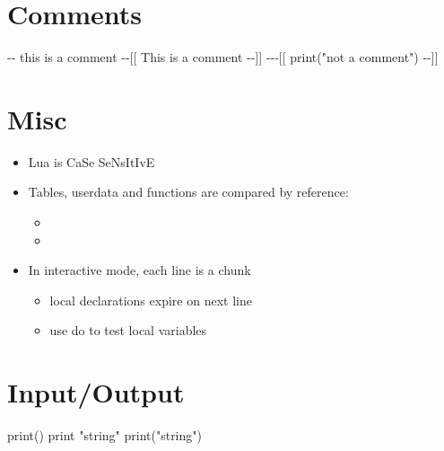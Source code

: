 \documentclass{refcard}
\begin{document}


\section{Comments}

\begin{ldesc}
	  -{-} this is a comment
	   -{-}[[ \li
	                          This is a comment \li
	                          -{-}]]
	 -{-}-[[ \li
	                               print("not a comment") \li
	                               -{-}]]
\end{ldesc}


\section{Misc}

\begin{itemize}
	\item Lua is CaSe SeNsItIvE
	\item Tables, userdata and functions are compared by reference:
	\begin{itemize}
	      \item \C{~~~~~~~~~~~~~~~~\{\} ~\~{}=~ \{\}}
		  \item {}
	\end{itemize}
	\item In interactive mode, each line is a chunk
	\begin{itemize}
		\item local declarations expire on next line
		\item use do to test local variables
	\end{itemize}
\end{itemize}


\section{Input/Output}

\begin{ldesc}
	    print()
	 print "string" \li %
	                                  print("string")
\end{ldesc}
\end{document}
